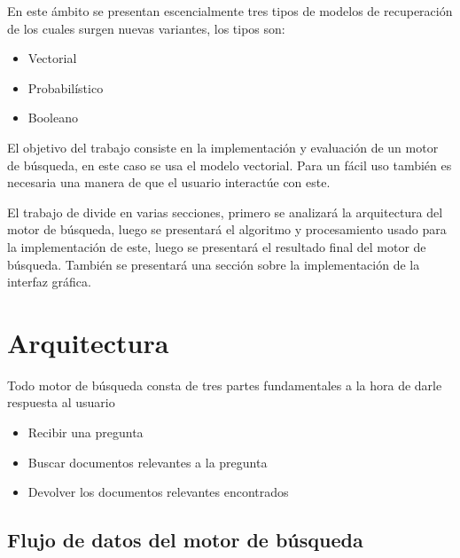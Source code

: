\documentclass[runningheads]{llncs}
\begin{document}
En este ámbito se presentan escencialmente tres tipos de modelos de recuperación de los
cuales surgen nuevas variantes, los tipos son:

\begin{itemize}
    \item Vectorial
    \item Probabilístico
    \item Booleano
\end{itemize}


El objetivo del trabajo consiste en la implementación y evaluación de un motor de búsqueda,
en este caso se usa el modelo vectorial. Para un fácil uso también es necesaria una manera
de que el usuario interactúe con este.

El trabajo de divide en varias secciones, primero se analizará la arquitectura del motor de
búsqueda, luego se presentará el algoritmo y procesamiento usado para la implementación de 
este, luego se presentará el resultado final del motor de búsqueda. También se presentará una
sección sobre la implementación de la interfaz gráfica. 

\section{Arquitectura}

Todo motor de búsqueda consta de tres partes fundamentales a la hora de darle respuesta al usuario

\begin{itemize}
    \item Recibir una pregunta
    \item Buscar documentos relevantes a la pregunta
    \item Devolver los documentos relevantes encontrados
\end{itemize}

\subsection{Flujo de datos del motor de búsqueda}
\end{document}
